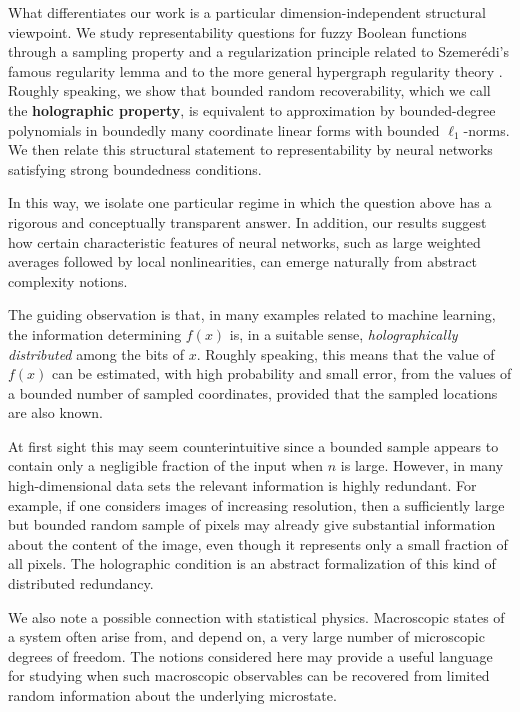 \documentclass[11pt]{amsart}
\newcommand{\1}{\mathbf 1}
\begin{document}
What differentiates our work is a particular dimension-independent structural
viewpoint.  We study representability questions for fuzzy Boolean functions
through a sampling property and a regularization principle related to
Szemer\'edi's famous regularity lemma \cite{Szemeredi,FriezeKannan} and to the more general hypergraph
regularity theory \cite{KNRSS,Gowers,Tao}. Roughly speaking, we show that bounded random recoverability, which we call
the {\bf holographic property}, is equivalent to approximation by bounded-degree
polynomials in boundedly many coordinate linear forms with bounded
\(\ell_1\)-norms. We then relate this structural statement to representability by neural networks satisfying strong boundedness conditions. 

In this way, we isolate one particular regime in which the question above has
a rigorous and conceptually transparent answer.  In addition, our results
suggest how certain characteristic features of neural networks, such as large
weighted averages followed by local nonlinearities, can emerge naturally from
abstract complexity notions.

The guiding observation is that, in many examples related to machine learning,
the information determining \(f(x)\) is, in a suitable sense,
\emph{holographically distributed} among the bits of \(x\).  Roughly speaking, this
means that the value of \(f(x)\) can be estimated, with high probability and
small error, from the values of a bounded number of sampled coordinates,
provided that the sampled locations are also known.

At first sight this may seem counterintuitive since a bounded sample appears to
contain only a negligible fraction of the input when \(n\) is large.  However,
in many high-dimensional data sets the relevant information is highly
redundant.  For example, if one considers images of increasing resolution, then
a sufficiently large but bounded random sample of pixels may already give substantial
information about the content of the image, even though it represents only a
small fraction of all pixels.  The holographic condition is an abstract
formalization of this kind of distributed redundancy.

We also note a possible connection with statistical physics.  Macroscopic
states of a system often arise from, and depend on, a very large number of
microscopic degrees of freedom.  The notions considered here may provide a
useful language for studying when such macroscopic observables can be recovered
from limited random information about the underlying microstate.
\end{document}
